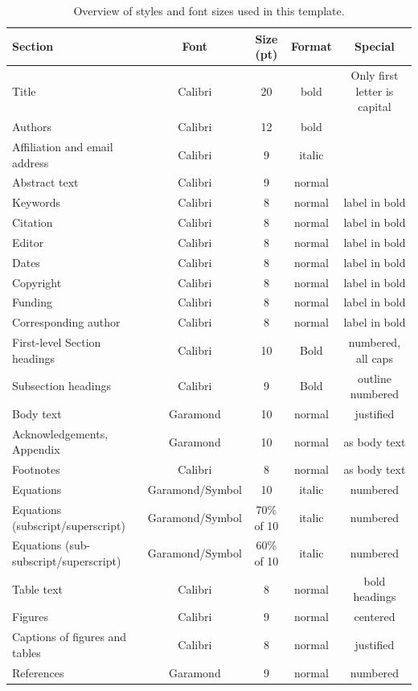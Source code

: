 \documentclass[10pt]{style_src/imeko_acta}
\begin{document}
\begin{table}[!h]
	\caption{Overview of styles and font sizes used in this template.}
	\label{tab:tab1}
	\centering
	\renewcommand{\arraystretch}{1.15}\footnotesize
	\begin{tabular*}{\textwidth}{@{\extracolsep{\fill}}lcccc}
		\toprule
		Section & Font & Size (pt) & Format & Special \\
		\midrule
		Title & Calibri & 20 & bold & Only first letter is capital \\
		Authors & Calibri & 12 & bold &  \\
		Affiliation and email address & Calibri & 9 & italic &  \\
		Abstract text & Calibri & 9 & normal &  \\
		Keywords & Calibri & 8 & normal & label in bold \\
		Citation & Calibri & 8 & normal & label in bold \\
		Editor & Calibri & 8 & normal & label in bold \\
		Dates & Calibri & 8 & normal & label in bold \\
		Copyright & Calibri & 8 & normal & label in bold \\
		Funding & Calibri & 8 & normal & label in bold \\
		Corresponding author & Calibri & 8 & normal & label in bold \\
		First-level Section headings  & Calibri & 10 & Bold & numbered, all caps \\
		Subsection headings & Calibri & 9 & Bold & outline numbered \\
		Body text & Garamond & 10 & normal & justified \\
		Acknowledgements, Appendix & Garamond & 10 & normal & as body text \\
		Footnotes  & Calibri & 8 & normal & as body text \\
		Equations & Garamond/Symbol & 10 & italic & numbered \\
		Equations (subscript/superscript) & Garamond/Symbol & 70\% of 10 & italic & numbered \\
		Equations (sub-subscript/superscript) & Garamond/Symbol & 60\% of 10 & italic & numbered \\
		Table text & Calibri & 8 & normal & bold headings \\
		Figures & Calibri & 9 & normal & centered \\
		Captions of figures and tables & Calibri & 8 & normal & justified \\
		References & Garamond & 9 & normal & numbered \\
		\bottomrule
	\end{tabular*}
\end{table}
\end{document}
